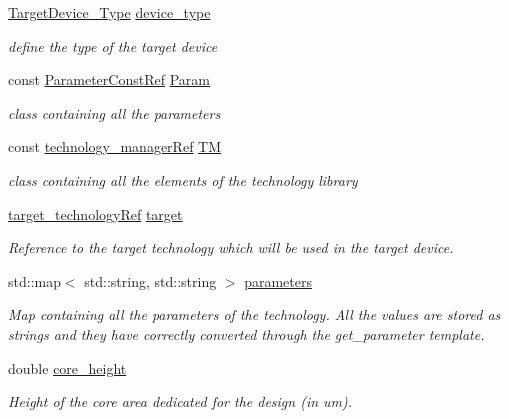 \begin{DoxyCompactItemize}
\item 
\hyperlink{target__device_8hpp_a476becc690220f0805ce73006449c732}{Target\+Device\+\_\+\+Type} \hyperlink{classtarget__device_aacaa16bc02d3ee7265cf8fc11c6d4863}{device\+\_\+type}
\begin{DoxyCompactList}\small\item\em define the type of the target device \end{DoxyCompactList}\item 
const \hyperlink{Parameter_8hpp_a37841774a6fcb479b597fdf8955eb4ea}{Parameter\+Const\+Ref} \hyperlink{classtarget__device_a2ab6118c487cc65cf7fe3462c96967ec}{Param}
\begin{DoxyCompactList}\small\item\em class containing all the parameters \end{DoxyCompactList}\item 
const \hyperlink{technology__manager_8hpp_a4b9ecd440c804109c962654f9227244e}{technology\+\_\+manager\+Ref} \hyperlink{classtarget__device_a941853b670a1b34eae7eab6bd21c854a}{TM}
\begin{DoxyCompactList}\small\item\em class containing all the elements of the technology library \end{DoxyCompactList}\item 
\hyperlink{target__technology_8hpp_a16af97aadc4eb998c2c9ec7fba5ccecd}{target\+\_\+technology\+Ref} \hyperlink{classtarget__device_a7b257760c9903566dc0f8260ee18a2eb}{target}
\begin{DoxyCompactList}\small\item\em Reference to the target technology which will be used in the target device. \end{DoxyCompactList}\item 
std\+::map$<$ std\+::string, std\+::string $>$ \hyperlink{classtarget__device_a37bac41e448c41385a9be771e4025ae2}{parameters}
\begin{DoxyCompactList}\small\item\em Map containing all the parameters of the technology. All the values are stored as strings and they have correctly converted through the get\+\_\+parameter template. \end{DoxyCompactList}\item 
double \hyperlink{classtarget__device_abdff345a8f1e00792ddc58a3a732dde4}{core\+\_\+height}
\begin{DoxyCompactList}\small\item\em Height of the core area dedicated for the design (in um). \end{DoxyCompactList}\item 

\end{DoxyCompactItemize}
